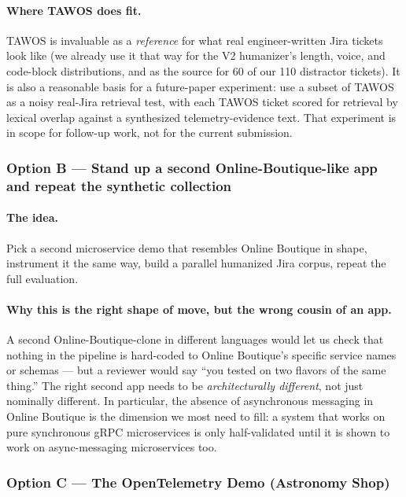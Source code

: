 \paragraph{Where TAWOS does fit.} TAWOS is invaluable as a \emph{reference} for what real engineer-written Jira tickets look like (we already use it that way for the V2 humanizer's length, voice, and code-block distributions, and as the source for 60 of our 110 distractor tickets). It is also a reasonable basis for a future-paper experiment: use a subset of TAWOS as a noisy real-Jira retrieval test, with each TAWOS ticket scored for retrieval by lexical overlap against a synthesized telemetry-evidence text. That experiment is in scope for follow-up work, not for the current submission.

\subsubsection{Option B --- Stand up a second Online-Boutique-like app and repeat the synthetic collection}

\paragraph{The idea.} Pick a second microservice demo that resembles Online Boutique in shape, instrument it the same way, build a parallel humanized Jira corpus, repeat the full evaluation.

\paragraph{Why this is the right shape of move, but the wrong cousin of an app.} A second Online-Boutique-clone in different languages would let us check that nothing in the pipeline is hard-coded to Online Boutique's specific service names or schemas --- but a reviewer would say ``you tested on two flavors of the same thing.'' The right second app needs to be \emph{architecturally different}, not just nominally different. In particular, the absence of asynchronous messaging in Online Boutique is the dimension we most need to fill: a system that works on pure synchronous gRPC microservices is only half-validated until it is shown to work on async-messaging microservices too.

\subsubsection{Option C --- The OpenTelemetry Demo (Astronomy Shop)}

